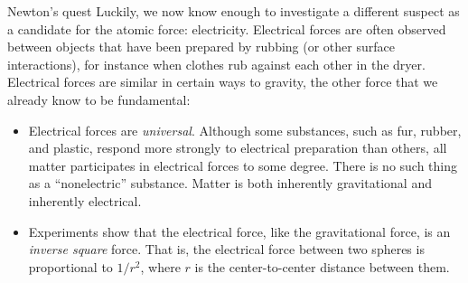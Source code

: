 \begin{envsubsection}{Newton's quest}
	Luckily, we now know enough to investigate a different
	suspect as a candidate for the atomic force: electricity.
	Electrical forces are often observed
	between objects that have been prepared by rubbing (or other
	surface interactions), for instance when clothes rub against
	each other in the dryer. 
	Electrical forces are similar in certain ways to
	gravity, the other force that we already know to be fundamental:

	\begin{itemize}
	\item Electrical forces are \emph{universal}. Although some
	substances, such as fur, rubber, and plastic, respond more
	strongly to electrical preparation than others, all matter
	participates in electrical forces to some degree. There is
	no such thing as a ``nonelectric'' substance. Matter is both
	inherently gravitational and inherently electrical.

	\item Experiments show that the electrical force, like the
	gravitational force, is an \emph{inverse square} force. That
	is, the electrical force between two spheres is proportional
	to $1/r^2$, where $r$ is the center-to-center distance between them.
	\end{itemize}
\end{envsubsection}
%
